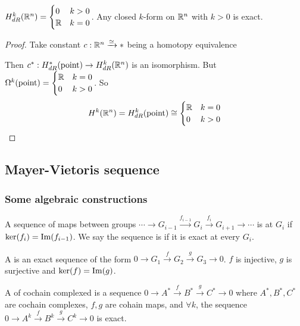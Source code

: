 
\begin{corollary}\label{Poincare Lemma}
     $ H^k_{dR}(\mathbb R^n)=\displaystyle\begin{cases}
        0 &k>0\\
        \mathbb R &k=0
     \end{cases} $. \ie Any closed  $ k $-form on  $ \mathbb R^n $ with  $ k>0 $  is exact. 
\end{corollary}
\begin{proof}
    Take constant  $ c:\mathbb R^n\xrightarrow{\simeq} *$ being a homotopy equivalence

    Then  $ c^*:H^*_{dR}(\text{point})\rightarrow H_{dR}^k(\mathbb R^n) $ is an isomorphism. But  $ \Omega^k(\text{point})=\begin{cases}
        \mathbb R &k=0\\
        0 &k>0
    \end{cases}  $. So
    \begin{equation*}
        H^k(\mathbb R^n)=H^k_{dR}(\text{point})\cong\begin{cases}
            \mathbb R&k=0\\
            0&k>0
        \end{cases}
    \end{equation*} 
\end{proof}
\subsection{Mayer-Vietoris sequence}
\subsubsection{Some algebraic constructions}
A sequence of maps between groups  $ \cdots\rightarrow G_{i-1}\xrightarrow{f_{i-1}} G_i\xrightarrow{f_i} G_{i+1}\rightarrow\cdots $ is  at  $ G_i $  if  $ \ker(f_i)=\mathrm{Im}(f_{i-1}) $. 
We say the sequence is  if it is exact at every  $ G_i$.

A  is an exact sequence of the form  $ 0\rightarrow G_1\xrightarrow{f} G_2\xrightarrow{g} G_3\rightarrow 0 $. \ie  $ f  $ is injective,  $ g  $ is surjective and  $ \ker(f)=\mathrm{Im}(g) $.

A  of cochain complexed is a sequence  $ 0\rightarrow A^*\xrightarrow{f}B^*\xrightarrow{g}C^*\rightarrow 0 $ where  $ A^*,B^*,C^* $ are cochain complexes,  $ f,g $ are cohain maps, and  $ \forall k $, the sequence  $ 0\rightarrow A^k\xrightarrow{f}B^k\xrightarrow{g}C^k\rightarrow 0 $     is exact.

